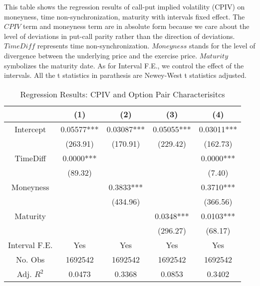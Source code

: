 
\begin{table}[h]
\centering
\caption{Regression Results: CPIV and Option Pair Characterisitcs}\label{table:regression1}
\begin{threeparttable}

\medskip

{\scriptsize 
This table shows the regression results of call-put implied volatility (CPIV) on moneyness, time non-synchronization, maturity with intervals fixed effect. The $CPIV$ term and moneyness term are in absolute form because we care about the level of deviations in put-call parity rather than the direction of deviations. $TimeDiff$ represents time non-synchronization. $Moneyness$ stands for the level of divergence between the underlying price and the exercise price. $Maturity$ symbolizes the maturity date. As for Interval F.E., we control the effect of the intervals. All the t statistics in parathesis are Newey-West t statistics adjusted.
}
\medskip
\small
\centering
\begin{tabular}{ccccc}
\toprule
              & (1)        & (2)        & (3)        & (4)        \\ \midrule
Intercept     & 0.05577*** & 0.03087*** & 0.05055*** & 0.03011*** \\
              & (263.91)   & (170.91)   & (229.42)   & (162.73)   \\
TimeDiff      & 0.0000***  &            &            & 0.0000***  \\
              & (89.32)    &            &            & (7.40)     \\
Moneyness     &            & 0.3833***  &            & 0.3710***  \\
              &            & (434.96)   &            & (366.56)   \\
Maturity      &            &            & 0.0348***  & 0.0103***  \\
              &            &            & (296.27)   & (68.17)    \\
Interval F.E. & Yes        & Yes        & Yes        & Yes        \\
No. Obs       & 1692542    & 1692542    & 1692542    & 1692542    \\
Adj. $R^{2}$  & 0.0473     & 0.3368     & 0.0853     & 0.3402     \\
\bottomrule
\end{tabular}


\end{threeparttable}
\end{table}
